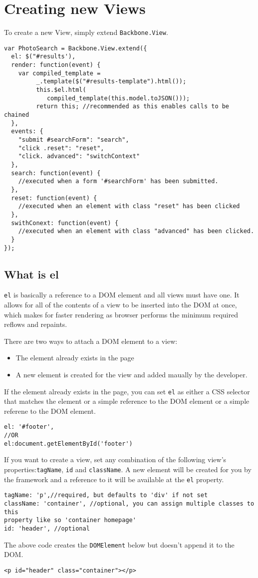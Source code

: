 \documentclass[a4paper, 11pt]{book}
\begin{document}
\section{Creating new Views}
To create a new View, simply extend \verb|Backbone.View|. 
\begin{verbatim}
var PhotoSearch = Backbone.View.extend({
  el: $("#results'),
  render: function(event) {
    var compiled_template =
         _.template($("#results-template").html());
         this.$el.html(
            compiled_template(this.model.toJSON()));
         return this; //recommended as this enables calls to be chained
  }, 
  events: {
    "submit #searchForm": "search",
    "click .reset": "reset",
    "click. advanced": "switchContext"
  },
  search: function(event) {
    //executed when a form '#searchForm' has been submitted.
  },
  reset: function(event) {
    //executed when an element with class "reset" has been clicked
  },
  swithConext: function(event) {
    //executed when an element with class "advanced" has been clicked.
  }
});
\end{verbatim}
\subsection{What is el}
\verb|el| is basically a reference to a DOM element and all views must
 have one. It allows for all of the contents of a view to be inserted 
 into the DOM at once, which makes for faster rendering as browser 
 performs the minimum required reflows and repaints.

 There are two ways to attach a DOM element to a view:
 \begin{itemize}
 \item The element already exists in the page
 \item A new element is created for the view and added maually by the developer.
 \end{itemize}
If the element already exists in the page, you can set \verb|el| as either a CSS
selector that matches the element or a simple reference to the DOM element or a
simple referene to the DOM element.
\begin{verbatim}
el: '#footer',
//OR
el:document.getElementById('footer')
\end{verbatim}
If you want to create a view, set any combination of the following view's
properties:\verb|tagName|, \verb|id| and \verb|className|. A new element will be
created for you by the framework and a reference to it will be available at the
\verb|el| property.
\begin{verbatim}
tagName: 'p',//required, but defaults to 'div' if not set
className: 'container', //optional, you can assign multiple classes to this
property like so 'container homepage'
id: 'header', //optional
\end{verbatim}
The above code creates the \verb|DOMElement| below but doesn't append it to the
DOM. 
\begin{verbatim}
<p id="header" class="container"></p>
\end{verbatim}
\end{document}
